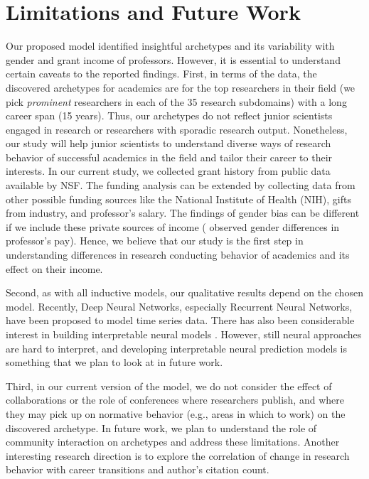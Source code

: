 \section{Limitations and Future Work}
\label{sec:Limitations}

Our proposed model identified insightful archetypes and its variability with gender and grant income of professors. However, it is essential to understand certain caveats to the reported findings.
First, in terms of the data, the discovered archetypes for academics are for the top researchers in their field (we pick \emph{prominent} researchers in each of the 35 research subdomains) with a long career span (15 years). Thus, our archetypes do not reflect junior scientists engaged in research or researchers with sporadic research output. Nonetheless, our study will help junior scientists to understand diverse ways of research behavior of successful academics in the field and tailor their career to their interests.
In our current study, we collected grant history from public data available by NSF. The funding analysis can be extended by collecting data from other possible funding sources like the National Institute of Health (NIH), gifts from industry, and professor's salary. The findings of gender bias can be different if we include these private sources of income (\cite{Ward:2001} observed gender differences in professor's pay).
Hence, we believe that our study is the first step in understanding differences in research conducting behavior of academics and its effect on their income.

Second, as with all inductive models, our qualitative results depend on the chosen model. Recently, Deep Neural Networks, especially Recurrent Neural Networks, have been proposed to model time series data. There has also been considerable interest in building interpretable neural models \cite{Ribeiro:2016, hima:2016}. However, still neural approaches are hard to interpret, and developing interpretable neural prediction models is something that we plan to look at in future work.

Third, in our current version of the model, we do not consider the effect of collaborations or the role of conferences where researchers publish, and where they may pick up on normative behavior (e.g., areas in which to work) on the discovered archetype. In future work, we plan to understand the role of community interaction on archetypes and address these limitations. Another interesting research direction is to explore the correlation of change in research behavior with career transitions and author's citation count.

